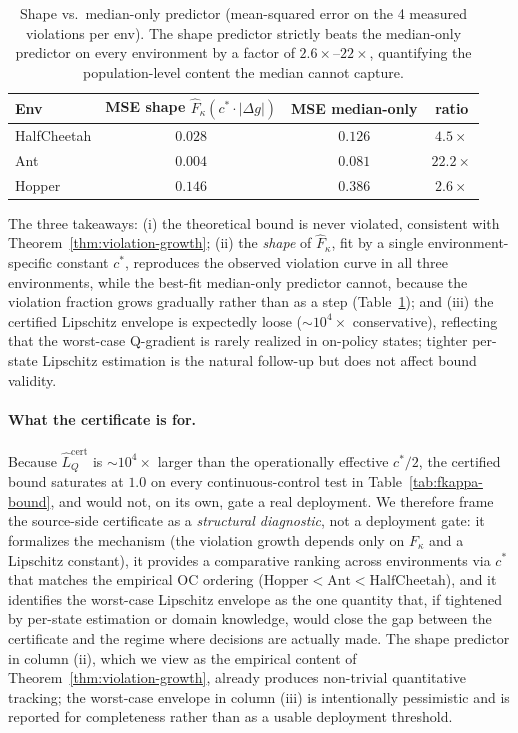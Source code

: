 \documentclass{article}
\begin{document}
\begin{table}[h]
\centering
\caption{Shape vs.\ median-only predictor (mean-squared error on the 4 measured violations per env). The shape predictor strictly beats the median-only predictor on every environment by a factor of $2.6\times$--$22\times$, quantifying the population-level content the median cannot capture.}
\label{tab:shape-vs-median}
\small
\begin{tabular}{lccc}
\toprule
Env & MSE shape $\hat F_\kappa(c^* \cdot |\Delta g|)$ & MSE median-only & ratio \\
\midrule
HalfCheetah & $0.028$ & $0.126$ & $4.5\times$ \\
Ant         & $0.004$ & $0.081$ & $22.2\times$ \\
Hopper      & $0.146$ & $0.386$ & $2.6\times$ \\
\bottomrule
\end{tabular}
\end{table}

The three takeaways: (i) the theoretical bound is never violated, consistent with Theorem~\ref{thm:violation-growth}; (ii) the \emph{shape} of $\hat F_\kappa$, fit by a single environment-specific constant $c^*$, reproduces the observed violation curve in all three environments, while the best-fit median-only predictor cannot, because the violation fraction grows gradually rather than as a step (Table~\ref{tab:shape-vs-median}); and (iii) the certified Lipschitz envelope is expectedly loose ($\sim 10^4\times$ conservative), reflecting that the worst-case Q-gradient is rarely realized in on-policy states; tighter per-state Lipschitz estimation is the natural follow-up but does not affect bound validity.

\paragraph{What the certificate is for.} Because $\hat L_Q^{\mathrm{cert}}$ is $\sim 10^4\times$ larger than the operationally effective $c^*/2$, the certified bound saturates at $1.0$ on every continuous-control test in Table~\ref{tab:fkappa-bound}, and would not, on its own, gate a real deployment. We therefore frame the source-side certificate as a \emph{structural diagnostic}, not a deployment gate: it formalizes the mechanism (the violation growth depends only on $F_\kappa$ and a Lipschitz constant), it provides a comparative ranking across environments via $c^*$ that matches the empirical OC ordering ($\mathrm{Hopper} < \mathrm{Ant} < \mathrm{HalfCheetah}$), and it identifies the worst-case Lipschitz envelope as the one quantity that, if tightened by per-state estimation or domain knowledge, would close the gap between the certificate and the regime where decisions are actually made. The shape predictor in column (ii), which we view as the empirical content of Theorem~\ref{thm:violation-growth}, already produces non-trivial quantitative tracking; the worst-case envelope in column (iii) is intentionally pessimistic and is reported for completeness rather than as a usable deployment threshold.
\end{document}

